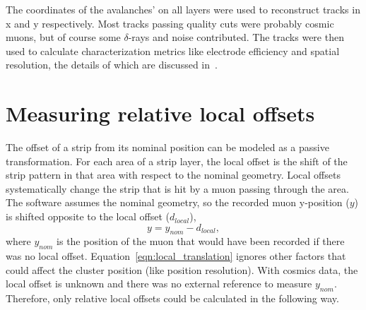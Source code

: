 The coordinates of the avalanches' on all layers were used to reconstruct tracks in x and y respectively. Most tracks passing quality cuts were probably cosmic muons, but of course some $\delta$-rays and noise contributed. The tracks were then used to calculate characterization metrics like electrode efficiency and spatial resolution, the details of which are discussed in~\cite{lefebvre_thesis}.



\section{Measuring relative local offsets}

The offset of a strip from its nominal position can be modeled as a passive transformation. For each area of a strip layer, the local offset is the shift of the strip pattern in that area with respect to the nominal geometry.  Local offsets systematically change the strip that is hit by a muon passing through the area. The  software assumes the nominal geometry, so the recorded muon y-position ($y$) is shifted opposite to the local offset ($d_{local}$),
\begin{equation}
    y = y_{nom} - d_{local},
    \label{eqn:local_translation}
\end{equation}
where $y_{nom}$ is the position of the muon that would have been recorded if there was no local offset. Equation~\ref{eqn:local_translation} ignores other factors that could affect the cluster position (like position resolution). With cosmics data, the local offset is unknown and there was no external reference to measure $y_{nom}$. Therefore, only relative local offsets could be calculated in the following way. 

